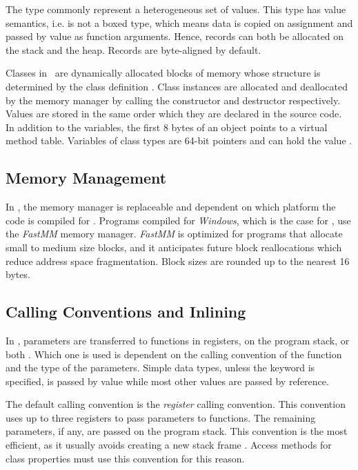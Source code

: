 The  type commonly represent a heterogeneous set of values. This type has value semantics, i.e. is not a boxed type, which means data is copied on assignment and passed by value as function arguments. Hence, records can both be allocated on the stack and the heap. Records are byte-aligned by default.

Classes in \delphi~are dynamically allocated blocks of memory whose structure is determined by the class definition \cite{noauthor_undated-un}. Class instances are allocated and deallocated by the memory manager by calling the constructor and destructor respectively. Values are stored in the same order which they are declared in the source code. In addition to the variables, the first 8 bytes of an object points to a virtual method table. Variables of class types are 64-bit pointers and can hold the value . 


\subsection{Memory Management}
\label{sub:Memory Management}
In \delphi, the memory manager is replaceable and dependent on which platform the code is compiled for \cite{noauthor_undated-ys}. Programs compiled for \textit{Windows}, which is the case for \gap, use the \textit{FastMM} memory manager. \textit{FastMM} is optimized for programs that allocate small to medium size blocks, and it anticipates future block reallocations which reduce address space fragmentation. Block sizes are rounded up to the nearest 16 bytes. 

\subsection{Calling Conventions and Inlining}
\label{sub:Calling Conventions and Inlining}
In \delphi, parameters are transferred to functions in registers, on the program stack, or both \cite{noauthor_undated-xi}. Which one is used is dependent on the calling convention of the function and the type of the parameters. Simple data types, unless the  keyword is specified, is passed by value while most other values are passed by reference.

The default calling convention is the \textit{register} calling convention. This convention uses up to three registers to pass parameters to functions. The remaining parameters, if any, are passed on the program stack. This convention is the most efficient, as it usually avoids creating a new stack frame \cite{noauthor_undated-xi}. Access methods for class properties must use this convention for this reason.

